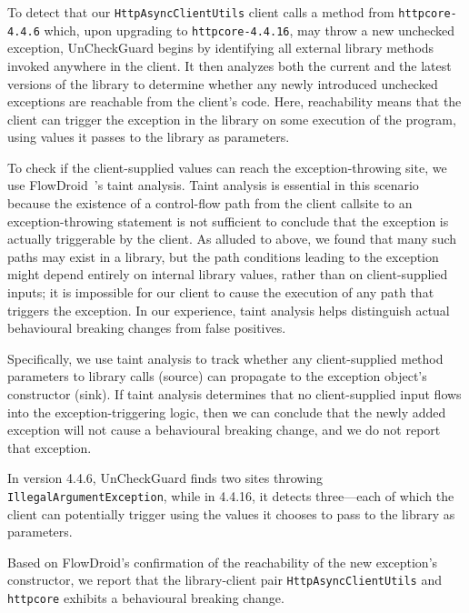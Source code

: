 To detect that our \texttt{HttpAsyncClientUtils} client calls a method from \texttt{httpcore-4.4.6} which, upon upgrading to \texttt{httpcore-4.4.16}, may throw a new unchecked exception, UnCheckGuard begins by identifying all external library methods invoked anywhere in the client. It then analyzes both the current and the latest versions of the library to determine whether any newly introduced unchecked exceptions are reachable from the client's code. Here, reachability means that the client can trigger the exception in the library on some execution of the program, using values it passes to the library as parameters.

To check if the client-supplied values can reach the exception-throwing site, we use FlowDroid~\cite{Arzt14:_flowdroid}'s taint analysis. Taint analysis is essential in this scenario because the existence of a control-flow path from the client callsite to an exception-throwing statement is not sufficient to conclude that the exception is actually triggerable by the client. As alluded to above, we found that many such paths may exist in a library, but the path conditions leading to the exception might depend entirely on internal library values, rather than on client-supplied inputs; it is impossible for our client to cause the execution of any path that triggers the exception. In our experience, taint analysis helps distinguish actual behavioural breaking changes from false positives.

Specifically, we use taint analysis to track whether any client-supplied method parameters to library calls (source) can propagate to the exception object's constructor (sink). If taint analysis determines that no client-supplied input flows into the exception-triggering logic, then we can conclude that the newly added exception will not cause a behavioural breaking change, and we do not report that exception.

In version 4.4.6, UnCheckGuard finds two sites throwing \texttt{IllegalArgumentException}, while in 4.4.16, it detects three—each of which the client can potentially trigger using the values it chooses to pass to the library as parameters.

Based on FlowDroid's confirmation of the reachability of the new exception's constructor, we report that the library-client pair \texttt{HttpAsyncClientUtils} and \texttt{httpcore} exhibits a behavioural breaking change.

